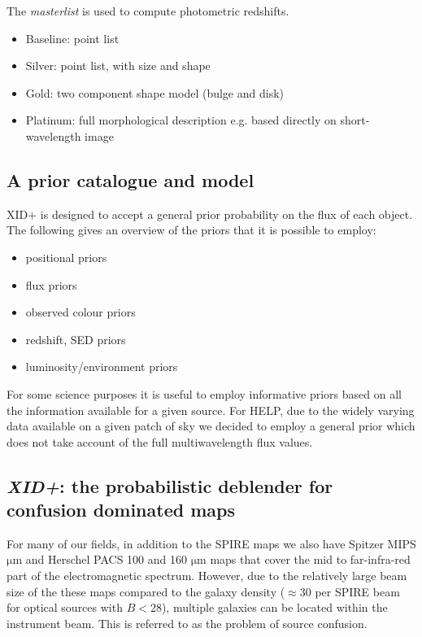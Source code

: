 \documentclass[usenatbib]{mnras}
\begin{document}
The \emph{masterlist} is used to compute photometric redshifts.

\begin{itemize}
  \item{Baseline: point list}
  \item{Silver: point list, with size and shape}
  \item{Gold: two component shape model (bulge and disk)}
  \item{Platinum: full morphological description e.g. based directly on
    short-wavelength image}
\end{itemize}

\subsection[Prior catalogue and model\\{\color{red}Describing how we define the different prior lists in each field/area}]{A prior catalogue and model}

{\sc XID+} is designed to accept a general prior probability on the flux of each object. The following gives an overview of the priors that it is possible to employ:

\begin{itemize}
  \item{positional priors}
  \item{flux priors}
  \item{observed colour priors}
  \item{redshift, SED priors}
  \item{luminosity/environment priors}
\end {itemize}

For some science purposes it is useful to employ informative priors based on all the information available for a given source. For HELP, due to the widely varying data available on a given patch of sky we decided to employ a general prior which does not take account of the full multiwavelength flux values. 

\subsection{\emph{XID+}: the probabilistic deblender for confusion dominated maps}
For many of our fields, in addition to the SPIRE maps we also have Spitzer MIPS $\mathrm{\mu m}$ and Herschel PACS 100 and 160 $\mathrm{\mu m}$ maps that cover the mid to far-infra-red part of the electromagnetic spectrum. However, due to the relatively large beam size of the these maps compared to the galaxy density ($\approx 30$ per SPIRE beam for optical sources with $B < 28$), multiple galaxies can be located within the instrument beam. This is referred to as the problem of source confusion.
\end{document}
